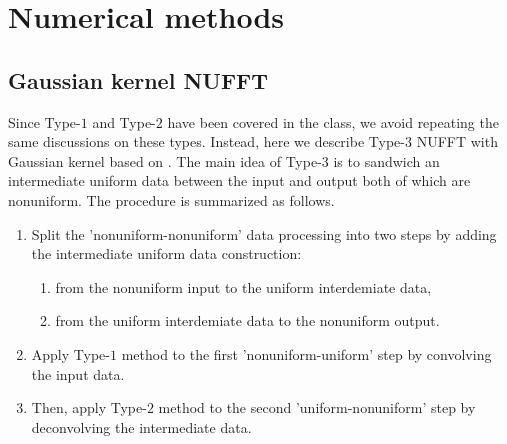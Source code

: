 \section{Numerical methods}

\subsection{Gaussian kernel NUFFT}
Since Type-$1$ and Type-$2$ have been covered in the class, we avoid repeating the same discussions on these types.
Instead, here we describe Type-$3$ NUFFT with Gaussian kernel based on \cite{JCP-2003-Greengard}.
The main idea of Type-$3$ is to sandwich an intermediate uniform data between the input and output both of which are nonuniform.
The procedure is summarized as follows.
\begin{enumerate}
  \item Split the 'nonuniform-nonuniform' data processing into two steps
  by adding the intermediate uniform data construction:
  \begin{enumerate}
    \item from the nonuniform input to the uniform interdemiate data,
    \item from the uniform interdemiate data to the nonuniform output.
  \end{enumerate}
  \item Apply Type-$1$ method to the first 'nonuniform-uniform' step by convolving the input data.
  \item Then, apply Type-$2$ method to the second 'uniform-nonuniform' step by deconvolving the intermediate data.
\end{enumerate}

